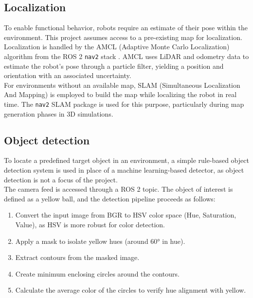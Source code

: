 
\subsection{Localization}
\label{sub:localization} 
To enable functional behavior, robots require an estimate of their pose within the environment. This project assumes access to a pre-existing map for localization. \\

Localization is handled by the AMCL (Adaptive Monte Carlo Localization) algorithm \cite{amcl, amcl-docs} from the ROS 2 \texttt{nav2} stack \cite{nav2, nav2-docs}. AMCL uses LiDAR and odometry data to estimate the robot’s pose through a particle filter, yielding a position and orientation with an associated uncertainty.\\

For environments without an available map, SLAM (Simultaneous Localization And Mapping) is employed to build the map while localizing the robot in real time. The \texttt{nav2} SLAM package is used for this purpose, particularly during map generation phases in 3D simulations.

\subsection{Object detection}
\label{sub:object_detection}
To locate a predefined target object in an environment, a simple rule-based object detection system is used in place of a machine learning-based detector, as object detection is not a focus of the project. \\

The camera feed is accessed through a ROS 2 topic. The object of interest is defined as a yellow ball, and the detection pipeline proceeds as follows:

\begin{enumerate}
    \item Convert the input image from BGR to HSV color space (Hue, Saturation, Value), as HSV is more robust for color detection.
    \item Apply a mask to isolate yellow hues (around 60° in hue).
    \item Extract contours from the masked image.
    \item Create minimum enclosing circles around the contours.
    \item Calculate the average color of the circles to verify hue alignment with yellow.
\end{enumerate}

